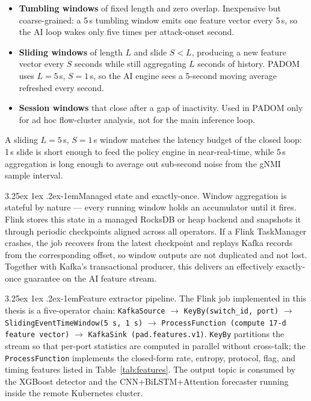 \documentclass[12pt, a4paper, reqno, oneside]{book}
\makeatletter
\newcommand{\padonap}{\textsc{PADOM}}
\renewcommand\paragraph{\@startsection{paragraph}{5}{\z@}%
  {3.25ex \@plus1ex \@minus.2ex}{-1em}{\normalfont\normalsize\bfseries}}
\makeatother
\begin{document}
\begin{itemize}
    \item \textbf{Tumbling windows} of fixed length and zero overlap.
          Inexpensive but coarse-grained: a 5\,s tumbling window emits one
          feature vector every 5\,s, so the AI loop wakes only five times
          per attack-onset second.
    \item \textbf{Sliding windows} of length $L$ and slide $S<L$, producing
          a new feature vector every $S$ seconds while still aggregating
          $L$ seconds of history. \padonap{} uses $L=5$\,s, $S=1$\,s,
          so the AI engine sees a 5-second moving average refreshed every
          second.
    \item \textbf{Session windows} that close after a gap of inactivity.
          Used in \padonap{} only for ad hoc flow-cluster analysis, not for
          the main inference loop.
\end{itemize}

A sliding $L{=}5$\,s, $S{=}1$\,s window matches the latency budget of the
closed loop: 1\,s slide is short enough to feed the policy engine in
near-real-time, while 5\,s aggregation is long enough to average out
sub-second noise from the gNMI sample interval.

\paragraph{Managed state and exactly-once.}
Window aggregation is stateful by nature --- every running window holds an
accumulator until it fires. Flink stores this state in a managed RocksDB or
heap backend and snapshots it through periodic checkpoints aligned
across all operators. If a Flink TaskManager crashes, the job recovers from
the latest checkpoint and replays Kafka records from the corresponding
offset, so window outputs are not duplicated and not lost. Together with
Kafka's transactional producer, this delivers an effectively
exactly-once guarantee on the AI feature stream.

\paragraph{Feature extractor pipeline.}
The Flink job implemented in this thesis is a five-operator chain:
\texttt{KafkaSource} $\rightarrow$ \texttt{KeyBy(switch\_id, port)}
$\rightarrow$ \texttt{SlidingEventTimeWindow(5\,s, 1\,s)}
$\rightarrow$ \texttt{ProcessFunction (compute 17-d feature vector)}
$\rightarrow$ \texttt{KafkaSink (\texttt{pad.features.v1})}.
\texttt{KeyBy} partitions the stream so that per-port statistics are
computed in parallel without cross-talk; the \texttt{ProcessFunction}
implements the closed-form rate, entropy, protocol, flag, and timing
features listed in Table~\ref{tab:features}. The output topic is consumed
by the XGBoost detector and the CNN+BiLSTM+Attention forecaster running
inside the remote Kubernetes cluster.
\end{document}
